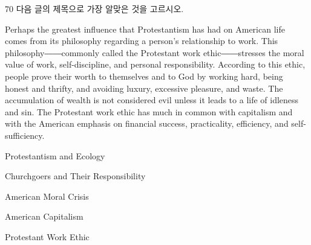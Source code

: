 \begin{question}{70}
다음 글의 제목으로 가장 알맞은 것을 고르시오.
\begin{framedtext}
Perhaps the greatest influence that Protestantism has had on American life comes from its philosophy regarding a person's relationship to work. This philosophy――commonly called the Protestant work ethic――stresses the moral value of work, self-discipline, and personal responsibility. According to this ethic, people prove their worth to themselves and to God by working hard, being honest and thrifty, and avoiding luxury, excessive pleasure, and waste. The accumulation of wealth is not considered evil unless it leads to a life of idleness and sin. The Protestant work ethic has much in common with capitalism and with the American emphasis on financial success, practicality, efficiency, and self-sufficiency.
\end{framedtext}
\begin{choices}
  \item Protestantism and Ecology
  \item Churchgoers and Their Responsibility
  \item American Moral Crisis
  \item American Capitalism
  \item Protestant Work Ethic
\end{choices}
\end{question}
